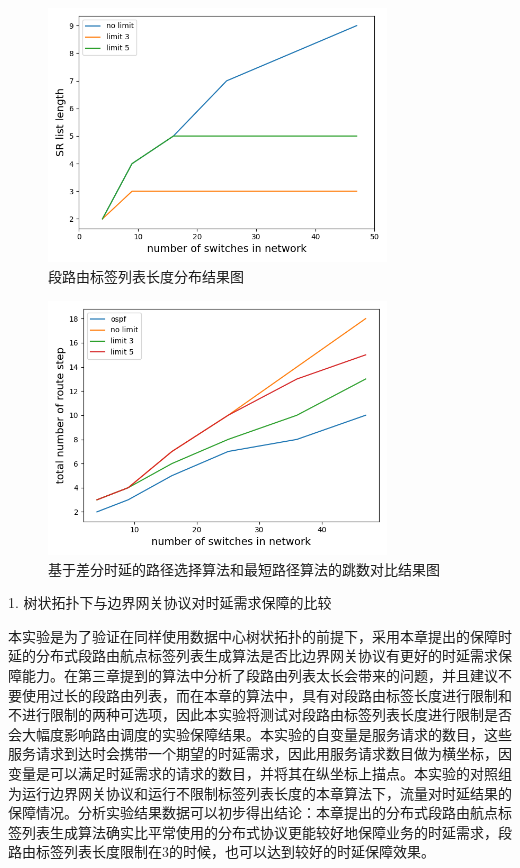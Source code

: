\begin{figure}[htbp]
\setlength{\abovecaptionskip}{15pt plus 3pt minus 2pt}
\centerline{\includegraphics[width=0.8\textwidth]{./figures/ch4-sl-length.png}}
\caption{段路由标签列表长度分布结果图}
\label{fig-ch4-sl-length}
\end{figure}

\begin{figure}[htbp]
\setlength{\abovecaptionskip}{15pt plus 3pt minus 2pt}
\centerline{\includegraphics[width=0.8\textwidth]{./figures/ch4-total-length.png}}
\caption{基于差分时延的路径选择算法和最短路径算法的跳数对比结果图}
\label{fig-ch4-total-length}
\end{figure}
                
1. 树状拓扑下与边界网关协议对时延需求保障的比较

本实验是为了验证在同样使用数据中心树状拓扑的前提下，采用本章提出的保障时延的分布式段路由航点标签列表生成算法是否比边界网关协议有更好的时延需求保障能力。在第三章提到的算法中分析了段路由列表太长会带来的问题，并且建议不要使用过长的段路由列表，而在本章的算法中，具有对段路由标签长度进行限制和不进行限制的两种可选项，因此本实验将测试对段路由标签列表长度进行限制是否会大幅度影响路由调度的实验保障结果。本实验的自变量是服务请求的数目，这些服务请求到达时会携带一个期望的时延需求，因此用服务请求数目做为横坐标，因变量是可以满足时延需求的请求的数目，并将其在纵坐标上描点。本实验的对照组为运行边界网关协议和运行不限制标签列表长度的本章算法下，流量对时延结果的保障情况。分析实验结果数据可以初步得出结论：本章提出的分布式段路由航点标签列表生成算法确实比平常使用的分布式协议更能较好地保障业务的时延需求，段路由标签列表长度限制在3的时候，也可以达到较好的时延保障效果。

